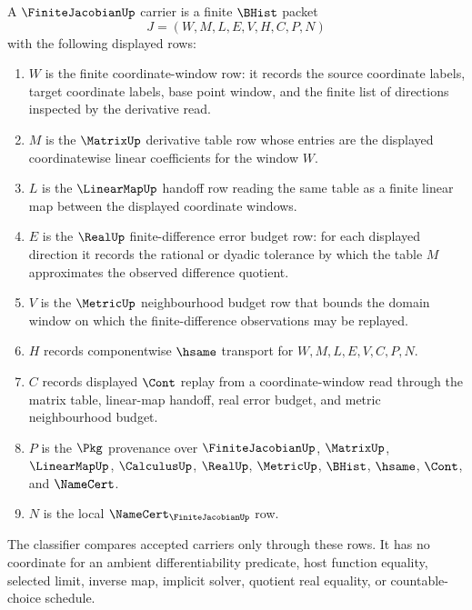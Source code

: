 \begin{definition}
\label{def:finite-jacobian-carrier}
A $\FiniteJacobianUp$ carrier is a finite $\BHist$ packet
$$
J=(W,M,L,E,V,H,C,P,N)
$$
with the following displayed rows:
\begin{enumerate}
\item $W$ is the finite coordinate-window row: it records the source coordinate labels, target coordinate labels, base point window, and the finite list of directions inspected by the derivative read.
\item $M$ is the $\MatrixUp$ derivative table row whose entries are the displayed coordinatewise linear coefficients for the window $W$.
\item $L$ is the $\LinearMapUp$ handoff row reading the same table as a finite linear map between the displayed coordinate windows.
\item $E$ is the $\RealUp$ finite-difference error budget row: for each displayed direction it records the rational or dyadic tolerance by which the table $M$ approximates the observed difference quotient.
\item $V$ is the $\MetricUp$ neighbourhood budget row that bounds the domain window on which the finite-difference observations may be replayed.
\item $H$ records componentwise $\hsame$ transport for $W,M,L,E,V,C,P,N$.
\item $C$ records displayed $\Cont$ replay from a coordinate-window read through the matrix table, linear-map handoff, real error budget, and metric neighbourhood budget.
\item $P$ is the $\Pkg$ provenance over $\FiniteJacobianUp$, $\MatrixUp$, $\LinearMapUp$, $\CalculusUp$, $\RealUp$, $\MetricUp$, $\BHist$, $\hsame$, $\Cont$, and $\NameCert$.
\item $N$ is the local $\NameCert_{\FiniteJacobianUp}$ row.
\end{enumerate}
The classifier compares accepted carriers only through these rows. It has no coordinate for an ambient differentiability predicate, host function equality, selected limit, inverse map, implicit solver, quotient real equality, or countable-choice schedule.
\end{definition}

